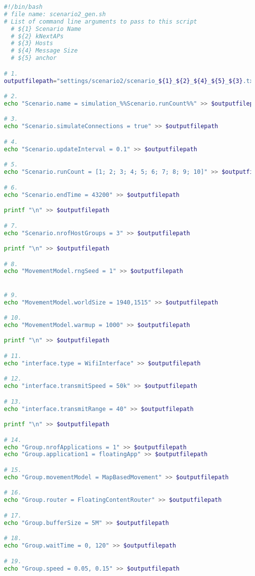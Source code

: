 \begin{lstlisting}[language=bash]
#!/bin/bash
# file name: scenario2_gen.sh
# List of command line arguments to pass to this script
  # ${1} Scenario Name
  # ${2} kNextAPs
  # ${3} Hosts
  # ${4} Message Size
  # ${5} anchor

# 1.
outputfilepath="settings/scenario2/scenario_${1}_${2}_${4}_${5}_${3}.txt"

# 2.
echo "Scenario.name = simulation_%%Scenario.runCount%%" >> $outputfilepath

# 3.
echo "Scenario.simulateConnections = true" >> $outputfilepath

# 4.
echo "Scenario.updateInterval = 0.1" >> $outputfilepath

# 5.
echo "Scenario.runCount = [1; 2; 3; 4; 5; 6; 7; 8; 9; 10]" >> $outputfilepath

# 6.
echo "Scenario.endTime = 43200" >> $outputfilepath

printf "\n" >> $outputfilepath

# 7.
echo "Scenario.nrofHostGroups = 3" >> $outputfilepath

printf "\n" >> $outputfilepath

# 8.
echo "MovementModel.rngSeed = 1" >> $outputfilepath


# 9.
echo "MovementModel.worldSize = 1940,1515" >> $outputfilepath

# 10.
echo "MovementModel.warmup = 1000" >> $outputfilepath

printf "\n" >> $outputfilepath

# 11.
echo "interface.type = WifiInterface" >> $outputfilepath

# 12.
echo "interface.transmitSpeed = 50k" >> $outputfilepath

# 13.
echo "interface.transmitRange = 40" >> $outputfilepath

printf "\n" >> $outputfilepath

# 14.
echo "Group.nrofApplications = 1" >> $outputfilepath
echo "Group.application1 = floatingApp" >> $outputfilepath

# 15.
echo "Group.movementModel = MapBasedMovement" >> $outputfilepath

# 16.
echo "Group.router = FloatingContentRouter" >> $outputfilepath

# 17.
echo "Group.bufferSize = 5M" >> $outputfilepath

# 18.
echo "Group.waitTime = 0, 120" >> $outputfilepath

# 19.
echo "Group.speed = 0.05, 0.15" >> $outputfilepath


\end{lstlisting}
